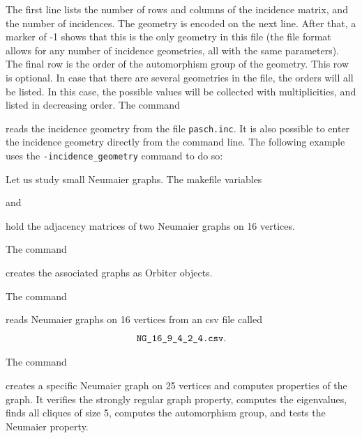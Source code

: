 
The first line lists the number of rows and columns of the incidence matrix, 
and the number of incidences. 
The geometry is encoded on the next line. 
After that, a marker of -1 shows that this is the only 
geometry in this file (the file format allows for any number of incidence geometries, 
all with the same parameters).
The final row is the order of the automorphism group of the geometry. 
This row is optional. In case that there are several geometries in the file, 
the orders will all be listed. In this case, the possible values will be 
collected with multiplicities, and listed in decreasing order.
The command 


reads the incidence geometry from the file \verb'pasch.inc'.
It is also possible to enter the incidence geometry 
directly from the command line. The following example 
uses the \verb'-incidence_geometry' command to do so:




\bigskip


Let us study small Neumaier graphs. 
The makefile variables


and


hold the adjacency matrices of two Neumaier graphs on 16 vertices.


The command 

 creates the associated graphs as Orbiter objects.


\bigskip

The command 

 reads Neumaier graphs on 16 vertices 
from an csv file called 
$$
\verb'NG_16_9_4_2_4.csv'.
$$

\bigskip

The command 

 creates a specific Neumaier graph on 25 vertices 
and computes properties of the graph. 
It verifies the strongly regular graph property, 
computes the eigenvalues, 
finds all cliques of size 5, 
computes the automorphism group, 
and tests the Neumaier property.

\bigskip





